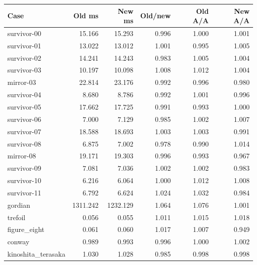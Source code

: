 \begin{center}\small
\begin{tabular}{lrrrrr}
\toprule
Case & Old ms & New ms & Old/new & Old A/A & New A/A \\
\midrule
survivor-00 & 15.166 & 15.293 & 0.996 & 1.000 & 1.001 \\
survivor-01 & 13.022 & 13.012 & 1.001 & 0.995 & 1.005 \\
survivor-02 & 14.241 & 14.243 & 0.983 & 1.005 & 1.004 \\
survivor-03 & 10.197 & 10.098 & 1.008 & 1.012 & 1.004 \\
mirror-03 & 22.814 & 23.176 & 0.992 & 0.996 & 0.980 \\
survivor-04 & 8.680 & 8.786 & 0.992 & 1.001 & 0.996 \\
survivor-05 & 17.662 & 17.725 & 0.991 & 0.993 & 1.000 \\
survivor-06 & 7.000 & 7.129 & 0.985 & 1.002 & 1.007 \\
survivor-07 & 18.588 & 18.693 & 1.003 & 1.003 & 0.991 \\
survivor-08 & 6.875 & 7.002 & 0.978 & 0.990 & 1.014 \\
mirror-08 & 19.171 & 19.303 & 0.996 & 0.993 & 0.967 \\
survivor-09 & 7.081 & 7.036 & 1.002 & 1.002 & 0.983 \\
survivor-10 & 6.216 & 6.064 & 1.000 & 1.012 & 1.008 \\
survivor-11 & 6.792 & 6.624 & 1.024 & 1.032 & 0.984 \\
gordian & 1311.242 & 1232.129 & 1.064 & 1.076 & 1.001 \\
trefoil & 0.056 & 0.055 & 1.011 & 1.015 & 1.018 \\
figure\_eight & 0.061 & 0.060 & 1.017 & 1.007 & 0.949 \\
conway & 0.989 & 0.993 & 0.996 & 1.000 & 1.002 \\
kinoshita\_terasaka & 1.030 & 1.028 & 0.985 & 0.998 & 0.998 \\
\bottomrule
\end{tabular}
\end{center}
